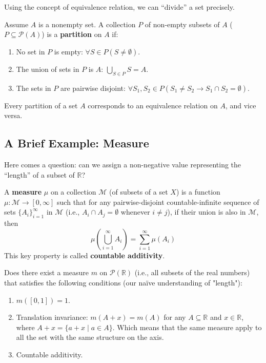 Using the concept of equivalence relation, we can “divide” a set precisely.
\begin{definition}[Partition]
Assume $A$ is a nonempty set. A collection $P$ of non-empty subsets of $A$ ($P \subseteq \mathcal{P}(A)$) is a \textbf{partition} on $A$ if:
\begin{enumerate}
    \item No set in $P$ is empty: $\forall S \in P (S \ne \emptyset)$.
    \item The union of sets in $P$ is $A$: $\bigcup_{S \in P} S = A$.
    \item The sets in $P$ are pairwise disjoint: $\forall S_1, S_2 \in P (S_1 \ne S_2 \to S_1 \cap S_2 = \emptyset)$.
\end{enumerate}
\end{definition}

\begin{theorem}
Every partition of a set $A$ corresponds to an equivalence relation on $A$, and vice versa.
\end{theorem}

\subsection{A Brief Example: Measure}
Here comes a question: can we assign a non-negative value representing the “length” of a subset of $\mathbb{R}$?

\begin{definition}[Measure]
A \textbf{measure} $\mu$ on a collection $\mathcal{M}$ (of subsets of a set $X$) is a function $\mu: \mathcal{M} \to [0, \infty]$ such that for any pairwise-disjoint countable-infinite sequence of sets $\{A_i\}_{i=1}^\infty$ in $\mathcal{M}$ (i.e., $A_i \cap A_j = \emptyset$ whenever $i \ne j$), if their union is also in $\mathcal{M}$, then
$$ \mu\left(\bigcup_{i=1}^\infty A_i\right) = \sum_{i=1}^\infty \mu(A_i) $$
This key property is called \textbf{countable additivity}.
\end{definition}

Does there exist a measure $m$ on $\mathcal{P}(\mathbb{R})$ (i.e., all subsets of the real numbers) that satisfies the following conditions (our naïve understanding of "length"):
\begin{enumerate}
    \item $m([0,1]) = 1$.
    \item Translation invariance: $m(A+x) = m(A)$ for any $A \subseteq \mathbb{R}$ and $x \in \mathbb{R}$, where $A+x = \{a+x \mid a \in A\}$. Which means that the same measure apply to all the set with the same structure on the axis.
    \item Countable additivity.
\end{enumerate}

